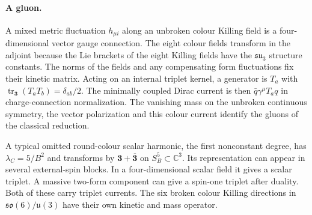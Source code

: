 \documentclass[10pt]{article}
\theoremstyle{definition}
\begin{document}
\paragraph{A gluon.} A mixed metric fluctuation \(h_{\mu i}\) along an unbroken colour Killing field is a four-dimensional vector gauge connection. The eight colour fields transform in the adjoint because the Lie brackets of the eight Killing fields have the \(\mathfrak{su}_3\) structure constants. The norms of the fields and any compensating form fluctuations fix their kinetic matrix. Acting on an internal triplet kernel, a generator is \(T_a\) with \(\operatorname{tr}_{\mathbf3}(T_aT_b)=\delta_{ab}/2\). The minimally coupled Dirac current is then \(\bar q\gamma^\mu T_a q\) in charge-connection normalization. The vanishing mass on the unbroken continuous symmetry, the vector polarization and this colour current identify the gluons of the classical reduction.

A typical omitted round-colour scalar harmonic, the first nonconstant degree, has \(\lambda_C=5/B^2\) and transforms by \(\mathbf3+\overline{\mathbf3}\) on \(S^5_B\subset \mathbb C^3\). Its representation can appear in several external-spin blocks. In a four-dimensional scalar field it gives a scalar triplet. A massive two-form component can give a spin-one triplet after duality. Both of these carry triplet currents. The six broken colour Killing directions in \(\mathfrak{so}(6)/\mathfrak u(3)\) have their own kinetic and mass operator.
\end{document}
